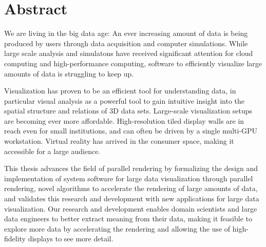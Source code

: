



\chapter*{Abstract} 
We are living in the big data age: An ever increasing amount of data is being
produced by users through data acquisition and computer simulations. While
large scale analysis and simulatons have received significant attention for
cloud computing and high-performance computing, software to efficiently
visualize large amounts of data is struggling to keep up.

Visualization has proven to be an efficient tool for understanding data, in
particular visual analysis as a powerful tool to gain intuitive insight into the
spatial structure and relations of 3D data sets. Large-scale visualization
setups are becoming ever more affordable. High-resolution tiled display walls
are in reach even for small institutions, and can often be driven by a single
multi-GPU workstation. Virtual reality has arrived in the consumer space,
making it accessible for a large audience.

This thesis advances the field of parallel rendering by formalizing the design
and implementation of system software for large data visualization through
parallel rendering, novel algorithms to accelerate the rendering of large
amounts of data, and validates this research and development with new
applications for large data visualization. Our research and development enables
domain scientists and large data engineers to better extract meaning from their
data, making it feasible to explore more data by accelerating the rendering and
allowing the use of high-fidelity displays to see more detail.


